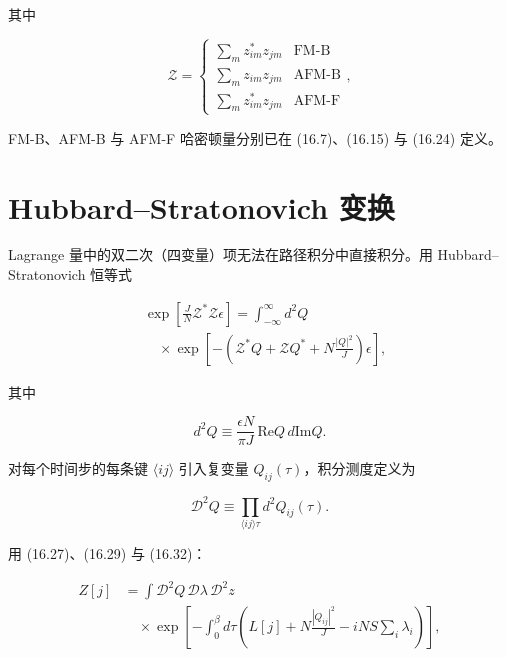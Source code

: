 其中

\begin{equation*}
\mathcal {Z} = \left\{ \begin{array}{ll} \sum_ {m} z _ {im} ^ {*} z _ {jm} & \mathrm{FM\mbox{-}B} \\ \sum_ {m} z _ {im} z _ {jm} & \mathrm{AFM\mbox{-}B} \\ \sum_ {m} z _ {im} ^ {*} z _ {jm} & \mathrm{AFM\mbox{-}F} \end{array} \right. ,
\tag{16.31}
\end{equation*}

FM-B、AFM-B 与 AFM-F 哈密顿量分别已在 (16.7)、(16.15) 与 (16.24) 定义。

\section{Hubbard--Stratonovich 变换}

Lagrange 量中的双二次（四变量）项无法在路径积分中直接积分。用 Hubbard--Stratonovich 恒等式

\begin{align*}
& \exp \left[ \frac {J}{N} \mathcal {Z} ^ {*} \mathcal {Z} \epsilon \right] = \int_{- \infty} ^ {\infty} d ^ {2} Q\\
& \quad \times \exp \left[ - \left( \mathcal {Z} ^ {*} Q + \mathcal {Z} Q ^ {*} + N \frac {| Q | ^ {2}}{J} \right) \epsilon \right] ,
\tag{16.32}
\end{align*}

其中

\begin{equation*}
d ^ {2} Q \equiv \frac {\epsilon N}{\pi J} \, \mathrm{Re} Q \, d \mathrm{Im} Q .
\tag{16.33}
\end{equation*}

对每个时间步的每条键 $\langle ij\rangle$ 引入复变量 $Q_{ij}(\tau)$，积分测度定义为

\begin{equation*}
\mathcal {D} ^ {2} Q \equiv \prod_{\langle ij \rangle \tau} d ^ {2} Q _ {ij} ( \tau ).
\tag{16.34}
\end{equation*}

用 (16.27)、(16.29) 与 (16.32)：

\begin{align*}
Z [ j ] & = \int \mathcal {D} ^ {2} Q \, \mathcal {D} \lambda \, \mathcal {D} ^ {2} z\\
& \quad \times \exp \left[ - \int_ {0} ^ {\beta} d \tau \left( L [ j ] + N \frac {| Q _ {ij} | ^ {2}}{J} - iNS \sum_ {i} \lambda_ {i} \right) \right] ,
\tag{16.35}
\end{align*}

